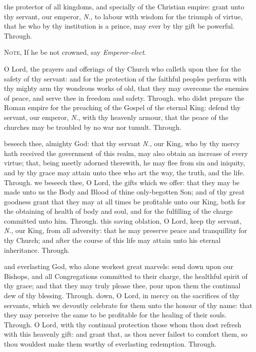 \begin{multicols}{2}

 the protector of all kingdoms, and specially of the Christian empire: grant unto thy servant, our emperor, \textit{N.}, to labour with wisdom for the triumph of virtue, that he who by thy institution is a prince, may ever by thy gift be powerful. Through.
\begin{rubric}
    \textsc{Note,} If he be not crowned, say \emph{Emperor-elect}.
\end{rubric}
 O Lord, the prayers and offerings of thy Church who calleth upon thee for the safety of thy servant: and for the protection of the faithful peoples perform with thy mighty arm thy wondrous works of old, that they may overcome the enemies of peace, and serve thee in freedom and safety. Through.
 who didst prepare the Roman empire for the preaching of the Gospel of the eternal King: defend thy servant, our emperor, \textit{N.}, with thy heavenly armour, that the peace of the churches may be troubled by no war nor tumult. Through.

 beseech thee, almighty God: that thy servant \textit{N.}, our King, who by thy mercy hath received the government of this realm, may also obtain an increase of every virtue; that, being meetly adorned therewith, he may flee from sin and iniquity, and by thy grace may attain unto thee who art the way, the truth, and the life. Through.
 we beseech thee, O Lord, the gifts which we offer: that they may be made unto us the Body and Blood of thine only-begotten Son; and of thy great goodness grant that they may at all times be profitable unto our King, both for the obtaining of health of body and soul, and for the fulfilling of the charge committed unto him. Through.
 this saving oblation, O Lord, keep thy servant, \textit{N.}, our King, from all adversity: that he may preserve peace and tranquillity for thy Church; and after the course of this life may attain unto his eternal inheritance. Through.

 and everlasting God, who alone workest great marvels: send down upon our Bishops, and all Congregations committed to their charge, the healthful spirit of thy grace; and that they may truly please thee, pour upon them the continual dew of thy blessing. Through.
 down, O Lord, in mercy on the sacrifices of thy servants, which we devoutly celebrate for them unto the honour of thy name: that they may perceive the same to be profitable for the healing of their souls. Through.
 O Lord, with thy continual protection those whom thou dost refresh with this heavenly gift: and grant that, as thou never failest to comfort them, so thou wouldest make them worthy of everlasting redemption. Through.


\end{multicols}
